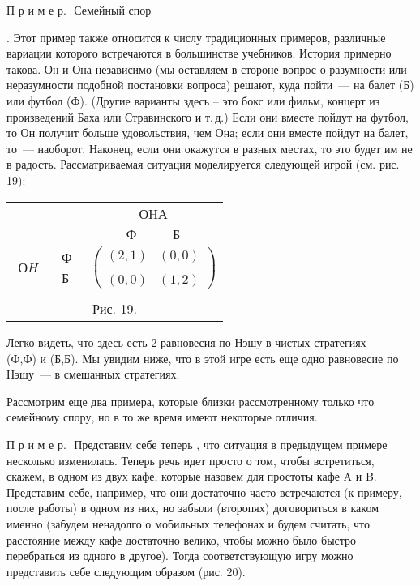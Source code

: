 \documentclass[12pt]{article}
\begin{document}
П р и м е р.\,\,  Семейный спор{. Этот пример также относится к
числу традиционных примеров, различные вариации которого встречаются
в большинстве учебников. История примерно такова. Он и Она
независимо (мы оставляем в стороне вопрос о разумности или
неразумности подобной постановки вопроса) решают, куда пойти~--- на
балет (Б) или  футбол (Ф). (Другие варианты здесь -- это бокс или
фильм, концерт из произведений Баха или Стравинского и т.\,д.) Если
они вместе пойдут на футбол, то Он получит больше удовольствия, чем
Она; если они вместе пойдут на балет, то~--- наоборот. Наконец, если
они окажутся в разных местах, то это будет им не в радость.
Рассматриваемая ситуация моделируется следующей игрой (см.
рис.\,19):

\begin{center}
\begin{tabular}{ccc}
&&ОHА\\
&&$\begin{array}{cc} Ф\quad&\quad Б\end{array}$\\
$\begin{array}{c} \\ ОH\\ \end{array}$& $\begin{array}{c} Ф\\ \\
Б\end{array}$& $\left(\begin{array}{cc}
(2,1)&(0,0)\\
\\
(0,0)&(1,2)\end{array}\right) $\\
\multicolumn{3}{c}{}\\
\multicolumn{3}{c}{Рис. 19.}\\
\end{tabular}
\end{center}

Легко видеть, что здесь есть 2 равновесия по Нэшу в чистых
стратегиях~--- (Ф,Ф) и (Б,Б). Мы увидим ниже, что в этой игре есть
еще одно равновесие по Нэшу~--- в смешанных стратегиях.
\smallskip

Рассмотрим еще два примера, которые близки рассмотренному только что
семейному спору, но в то же время имеют некоторые отличия.

П р и м е р.\,\, Представим себе теперь , что ситуация в предыдущем
примере несколько изменилась. Теперь речь идет просто о том, чтобы
встретиться, скажем, в одном из двух кафе, которые назовем для
простоты кафе A и B. Представим себе, например, что они достаточно
часто встречаются (к примеру, после работы) в одном из них, но
забыли (второпях) договориться в каком именно (забудем ненадолго о
мобильных телефонах и будем считать, что расстояние между кафе
достаточно велико, чтобы можно было быстро перебраться из одного в
другое). Тогда соответствующую игру можно представить себе следующим
образом (рис. 20).

}
\end{document}
